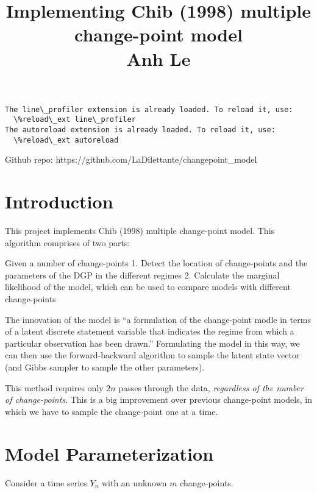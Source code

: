 \documentclass{article}
\title{Implementing Chib (1998) multiple change-point model \\ Anh Le}
\begin{document}
    
    
    \maketitle
    
    

    

    \begin{Verbatim}[commandchars=\\\{\}]
The line\_profiler extension is already loaded. To reload it, use:
  \%reload\_ext line\_profiler
The autoreload extension is already loaded. To reload it, use:
  \%reload\_ext autoreload
    \end{Verbatim}

    Github repo: https://github.com/LaDilettante/changepoint\_model

    \section{Introduction}\label{introduction}

This project implements Chib (1998) multiple change-point model. This
algorithm comprises of two parts:

Given a number of change-points 1. Detect the location of change-points
and the parameters of the DGP in the different regimes 2. Calculate the
marginal likelihood of the model, which can be used to compare models
with different change-points

The innovation of the model is ``a formulation of the change-point modle
in terms of a latent discrete statement variable that indicates the
regime from which a particular observation has been drawn.'' Formulating
the model in this way, we can then use the forward-backward algorithm to
sample the latent state vector (and Gibbs sampler to sample the other
parameters).

This method requires only $2n$ passes through the data, \emph{regardless
of the number of change-points}. This is a big improvement over previous
change-point models, in which we have to sample the change-point one at
a time.

    \section{Model Parameterization}\label{model-parameterization}

Consider a time series $Y_n$ with an unknown $m$ change-points.
\end{document}
